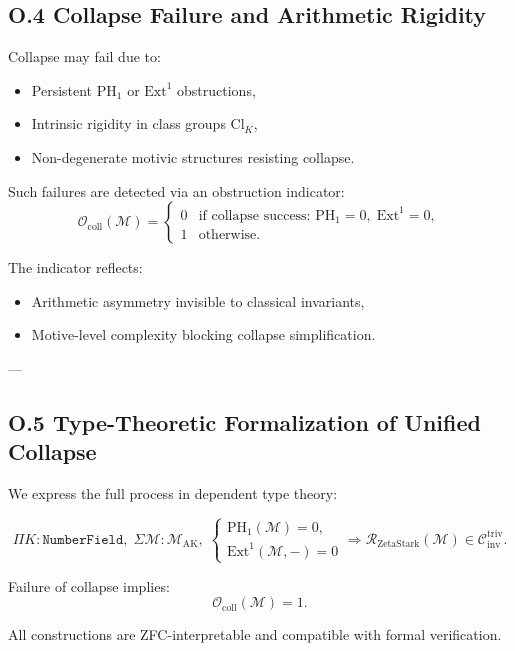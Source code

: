 \documentclass[11pt]{article}
\begin{document}
\subsection*{O.4 Collapse Failure and Arithmetic Rigidity}

Collapse may fail due to:
\begin{itemize}
  \item Persistent \( \mathrm{PH}_1 \) or \( \mathrm{Ext}^1 \) obstructions,
  \item Intrinsic rigidity in class groups \( \mathrm{Cl}_K \),
  \item Non-degenerate motivic structures resisting collapse.
\end{itemize}

Such failures are detected via an obstruction indicator:
\[
\mathcal{O}_{\mathrm{coll}}(\mathcal{M}) =
\begin{cases}
0 & \text{if collapse success: } \mathrm{PH}_1 = 0,\; \mathrm{Ext}^1 = 0, \\
1 & \text{otherwise.}
\end{cases}
\]

The indicator reflects:
\begin{itemize}
  \item Arithmetic asymmetry invisible to classical invariants,
  \item Motive-level complexity blocking collapse simplification.
\end{itemize}

---

\subsection*{O.5 Type-Theoretic Formalization of Unified Collapse}

We express the full process in dependent type theory:

\[
\Pi K : \texttt{NumberField}, \;
\Sigma \mathcal{M} : \mathcal{M}_{\mathrm{AK}}, \;
\begin{cases}
\mathrm{PH}_1(\mathcal{M}) = 0, \\
\mathrm{Ext}^1(\mathcal{M}, -) = 0
\end{cases}
\Rightarrow
\mathcal{R}_{\mathrm{ZetaStark}}(\mathcal{M}) \in \mathcal{C}_{\mathrm{inv}}^{\mathrm{triv}}.
\]

Failure of collapse implies:
\[
\mathcal{O}_{\mathrm{coll}}(\mathcal{M}) = 1.
\]

All constructions are ZFC-interpretable and compatible with formal verification.
\end{document}

